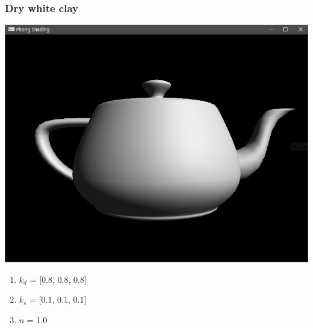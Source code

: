 \documentclass{beamer}
\begin{document}
\begin{frame}
    \frametitle{Dry white clay}

    \begin{center}
        \includegraphics[scale=0.2]{q5-white-clay.png}
    \end{center}

    \begin{enumerate}
        \item $k_d$ = [0.8, 0.8, 0.8]
        \item $k_s$ = [0.1, 0.1, 0.1]
        \item $n$ = 1.0
    \end{enumerate}

\end{frame}
\end{document}
